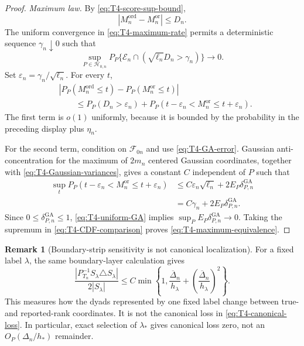 \documentclass[11pt]{article}
\theoremstyle{definition}
\newtheorem{remark}[definition]{Remark}
\newcommand{\1}{\mathbf 1}\newcommand{\op}{\operatorname}
\begin{document}
\begin{proof}
\emph{Maximum law.}
By \eqref{eq:T4-score-sup-bound},
\begin{equation}
 |M_n^{\mathrm{ord}}-M_n^{\mathrm{or}}|\le D_n.
 \label{eq:T4-max-Lipschitz}
\end{equation}
The uniform convergence in \eqref{eq:T4-maximum-rate} permits a
deterministic sequence $\gamma_n\downarrow0$ such that
\[
 \sup_{P\in\mathcal H_{0,n}}
 P_P\{\mathcal E_n\cap
       (\sqrt{\ell_n}D_n>\gamma_n)\}\to0.
\]
Set $\varepsilon_n=\gamma_n/\sqrt{\ell_n}$.  For every $t$,
\begin{align}
 &|P_P(M_n^{\mathrm{ord}}\le t)
       -P_P(M_n^{\mathrm{or}}\le t)|\nonumber\\
 &\qquad\le P_P(D_n>\varepsilon_n)
 +P_P(t-\varepsilon_n<M_n^{\mathrm{or}}
                    \le t+\varepsilon_n).
 \label{eq:T4-CDF-comparison}
\end{align}
The first term is $o(1)$ uniformly, because it is bounded by the
probability in the preceding display plus $\eta_n$.

For the second term, condition on $\mathcal F_{0n}$ and use
\eqref{eq:T4-GA-error}.  Gaussian anti-concentration for the maximum
of $2m_n$ centered Gaussian coordinates, together with
\eqref{eq:T4-Gaussian-variances}, gives a constant $C$ independent of
$P$ such that
\begin{align*}
 \sup_tP_P(t-\varepsilon_n<M_n^{\mathrm{or}}
                    \le t+\varepsilon_n)
 &\le C\varepsilon_n\sqrt{\ell_n}
      +2E_P\delta_{P,n}^{\mathrm{GA}}\\
 &=C\gamma_n+2E_P\delta_{P,n}^{\mathrm{GA}}.
\end{align*}
Since $0\le\delta_{P,n}^{\mathrm{GA}}\le1$,
\eqref{eq:T4-uniform-GA} implies
$\sup_PE_P\delta_{P,n}^{\mathrm{GA}}\to0$.  Taking the supremum in
\eqref{eq:T4-CDF-comparison} proves
\eqref{eq:T4-maximum-equivalence}.
\end{proof}

\begin{remark}[Boundary-strip sensitivity is not canonical localization]
\label{rem:T4-membership-sensitivity}
For a fixed label $\lambda$, the same boundary-layer calculation gives
\begin{equation}
 \frac{|P_{T_n}^{-1}S_\lambda\triangle S_\lambda|}
      {2|S_\lambda|}
 \le C\min\!\left\{
  1,
  \frac{\overline\Delta_n}{h_\lambda}
  +\left(\frac{\overline\Delta_n}{h_\lambda}\right)^2
 \right\}.
 \label{eq:T4-membership-sensitivity}
\end{equation}
This measures how the dyads represented by one fixed label change
between true- and reported-rank coordinates.  It is not the canonical
loss in \eqref{eq:T4-canonical-loss}.  In particular, exact selection
of $\lambda_*$ gives canonical loss zero, not an
$O_P(\Delta_n/h_*)$ remainder.
\end{remark}
\end{document}

